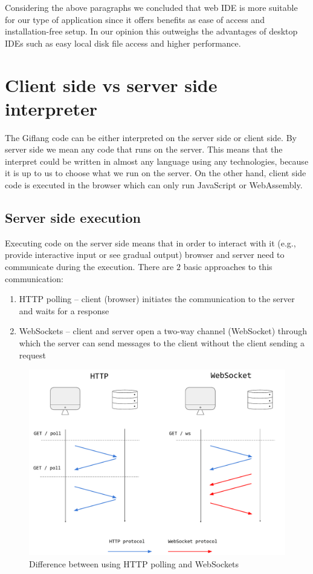 Considering the above paragraphs we concluded that web IDE is more suitable for our type of application since it offers benefits as
ease of access and installation-free setup. In our opinion this outweighs the advantages of desktop IDEs such as easy local disk
file access and higher performance.

\section{Client side vs server side interpreter}

The Giflang code can be either interpreted on the server side or client side. By server side we mean any code that runs on the server. This means that
the interpret could be written in almost any language using any technologies, because it is up to us to choose what we run on the server. On the other hand,
client side code is executed in the browser which can only run JavaScript or WebAssembly.

\subsection{Server side execution}
Executing code on the server side means that in order to interact with it (e.g., provide interactive input or see gradual output) browser and
server need to communicate during the execution. There are $2$ basic approaches to this communication:
\begin{enumerate}
\item HTTP polling -- client (browser) initiates the communication to the server and waits for a response
\item WebSockets -- client and server open a two-way channel (WebSocket) through which the server can send messages to the client without
the client sending a request 
\end{enumerate}

\begin{figure}[!hbt]
	\includegraphics[width=\textwidth]{../img/websockets}
	\caption{Difference between using HTTP polling and WebSockets}
	\label{fig:chap2:websockets}
\end{figure}

